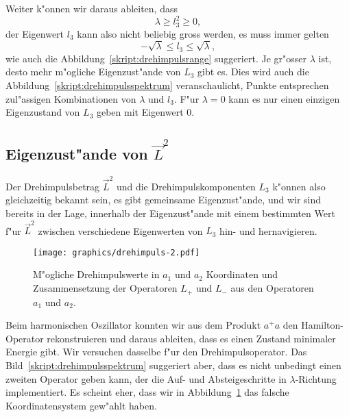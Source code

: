Weiter k"onnen wir daraus ableiten, dass 
\[
\lambda\ge l_3^2\ge 0,
\]
der Eigenwert $l_3$ kann also nicht beliebig gross werden, es muss immer
gelten
\[
-\sqrt{\lambda}\le l_3\le \sqrt{\lambda},
\]
wie auch die Abbildung~\ref{skript:drehimpulsrange} suggeriert.
Je gr"osser $\lambda$ ist, desto mehr m"ogliche Eigenzust"ande von $L_3$
gibt es.
Dies wird auch die Abbildung~\ref{skript:drehimpulsspektrum} veranschaulicht,
Punkte entsprechen zul"assigen Kombinationen von $\lambda$ und $l_3$.
F"ur $\lambda=0$ kann es nur einen einzigen Eigenzustand von $L_3$ geben
mit Eigenwert $0$.

\subsection{Eigenzust"ande von $\vec L^2$}
Der Drehimpulsbetrag $\vec L^2$ und die Drehimpulskomponenten $L_3$ 
k"onnen also gleichzeitig bekannt sein, es gibt gemeinsame Eigenzust"ande,
und wir sind bereits in der Lage, innerhalb der Eigenzust"ande mit einem
bestimmten Wert f"ur $\vec L^2$ zwischen verschiedene
Eigenwerten von $L_3$ hin- und hernavigieren.

\begin{figure}
\centering
\texttt{[image: graphics/drehimpuls-2.pdf]}
\caption{M"ogliche Drehimpulswerte in $a_1$ und $a_2$ Koordinaten und
Zusammensetzung der Operatoren $L_+$ und $L_-$ aus den Operatoren
$a_1$ und $a_2$.
\label{skript:drehimpulsspektruma}}
\end{figure}
Beim harmonischen Oszillator konnten wir aus dem Produkt $a^+a$
den Hamilton-Operator rekonstruieren und daraus ableiten, dass es einen
Zustand minimaler Energie gibt.
Wir versuchen dasselbe f"ur den Drehimpulsoperator.
Das Bild~\ref{skript:drehimpulsspektrum} suggeriert aber, dass es nicht
unbedingt einen zweiten Operator geben kann, der die
Auf- und Absteigeschritte in $\lambda$-Richtung implementiert.
Es scheint eher, dass wir in Abbildung~\ref{skript:drehimpulsspektruma}
das falsche Koordinatensystem gew"ahlt haben.

